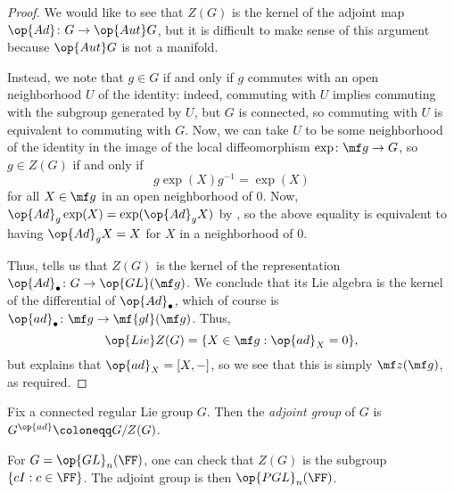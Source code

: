 \documentclass[../notes.tex]{subfiles}
\begin{document}
\begin{proof}
	We would like to see that $Z(G)$ is the kernel of the adjoint map $\op{Ad}\colon G\to\op{Aut}G$, but it is difficult to make sense of this argument because $\op{Aut}G$ is not a manifold.

	Instead, we note that $g\in G$ if and only if $g$ commutes with an open neighborhood $U$ of the identity: indeed, commuting with $U$ implies commuting with the subgroup generated by $U$, but $G$ is connected, so commuting with $U$ is equivalent to commuting with $G$. Now, we can take $U$ to be some neighborhood of the identity in the image of the local diffeomorphism $\exp\colon\mf g\to G$, so $g\in Z(G)$ if and only if
	\[g\exp(X)g^{-1}=\exp(X)\]
	for all $X\in\mf g$ in an open neighborhood of $0$. Now, $\op{Ad}_g\exp(X)=\exp(\op{Ad}_gX)$ by , so the above equality is equivalent to having $\op{Ad}_gX=X$ for $X$ in a neighborhood of $0$.

	Thus,  tells us that $Z(G)$ is the kernel of the representation $\op{Ad}_\bullet\colon G\to\op{GL}(\mf g)$. We conclude that its Lie algebra is the kernel of the differential of $\op{Ad}_\bullet$, which of course is $\op{ad}_\bullet\colon\mf g\to\mf{gl}(\mf g)$. Thus,
	\[\op{Lie}Z(G)=\{X\in\mf g:{\op{ad}_X}=0\},\]
	but  explains that ${\op{ad}_X}=[X,-]$, so we see that this is simply $\mf z(\mf g)$, as required.
\end{proof}
\begin{definition}[adjoint]
	Fix a connected regular Lie group $G$. Then the \textit{adjoint group} of $G$ is $G^{\op{ad}}\coloneqq G/Z(G)$.
\end{definition}
\begin{example}
	For $G=\op{GL}_n(\FF)$, one can check that $Z(G)$ is the subgroup $\{cI:c\in\FF\}$. The adjoint group is then $\op{PGL}_n(\FF)$.
\end{example}
\end{document}
